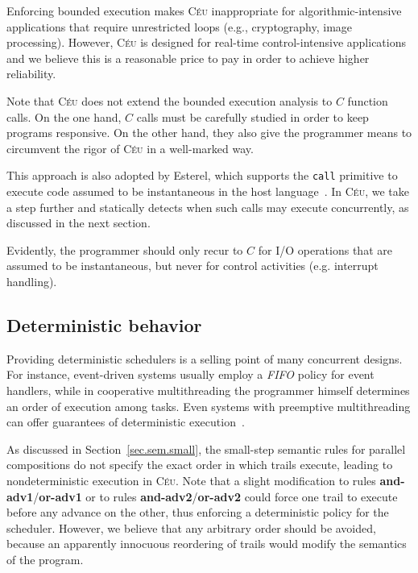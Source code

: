 \documentclass[preprint]{sigplanconf}
\newcommand{\CEU}{\textsc{C\'{e}u}\xspace}
\newcommand{\code}[1] {{\small{\texttt{#1}}}}
\newcommand{\1}{\;}
\newcommand{\2}{\;\;}
\newcommand{\3}{\;\;\;}
\newcommand{\5}{\;\;\;\;\;}
\begin{document}

Enforcing bounded execution makes \CEU inappropriate for algorithmic-intensive 
applications that require unrestricted loops (e.g., cryptography, image processing).
However, \CEU is designed for real-time control-intensive applications and we 
believe this is a reasonable price to pay in order to achieve higher 
reliability.

Note that \CEU does not extend the bounded execution analysis to $C$ function 
calls. %
On the one hand, $C$ calls must be carefully studied in order to keep programs 
responsive.
On the other hand, they also give the programmer means to circumvent the rigor 
of \CEU in a well-marked way.

This approach is also adopted by Esterel, which supports the \code{call} 
primitive to execute code assumed to be instantaneous in the host 
language~\cite{esterel.primer}.
In \CEU, we take a step further and statically detects when such calls may 
execute concurrently, as discussed in the next section.

Evidently, the programmer should only recur to $C$ for I/O operations that are 
assumed to be instantaneous, but never for control activities (e.g. interrupt 
handling).

\subsection{Deterministic behavior}
\label{sec.safety.det}

Providing deterministic schedulers is a selling point of many concurrent 
designs.
For instance, event-driven systems usually employ a \emph{FIFO} policy for 
event handlers, while in cooperative multithreading the programmer himself 
determines an order of execution among tasks.
Even systems with preemptive multithreading can offer guarantees of 
deterministic execution~\cite{async.kendo}.

As discussed in Section~\ref{sec.sem.small}, the small-step semantic rules for 
parallel compositions do not specify the exact order in which trails execute, 
leading to nondeterministic execution in \CEU.
Note that a slight modification to rules \textbf{and-adv1}/\textbf{or-adv1} or 
to rules \textbf{and-adv2}/\textbf{or-adv2} could force one trail to execute 
before any advance on the other, thus enforcing a deterministic policy for the 
scheduler.
However, we believe that any arbitrary order should be avoided, because an 
apparently innocuous reordering of trails would modify the semantics of the 
program.
\end{document}
